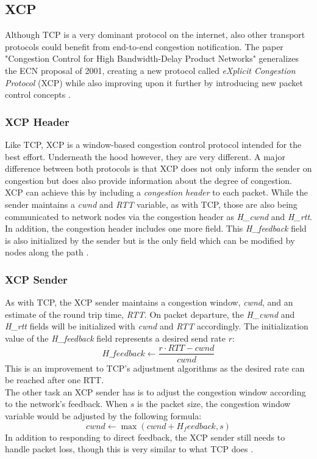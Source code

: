 \documentclass[a4paper,conference]{IEEEtran}
\begin{document}
\subsection{XCP}
Although TCP is a very dominant protocol on the internet, also other transport protocols could benefit from end-to-end congestion notification. The paper "Congestion Control for High Bandwidth-Delay Product Networks"  generalizes the ECN proposal of 2001, creating a new protocol called \textit{eXplicit Congestion Protocol} (XCP) while also improving upon it further by introducing new packet control concepts \cite{katabi2002congestion,1498331}.

\subsubsection*{XCP Header}
Like TCP, XCP is a window-based congestion control protocol intended for the best effort. Underneath the hood however, they are very different. A major difference between both protocols is that XCP does not only inform the sender on congestion but does also provide information about the degree of congestion. XCP can achieve this by including a \textit{congestion header} to each packet. While the sender maintains a \textit{cwnd} and \textit{RTT} variable, as with TCP, those are also being communicated to network nodes via the congestion header as \textit{H\_cwnd} and \textit{H\_rtt}. In addition, the congestion header includes one more field. This \textit{H\_feedback} field is also initialized by the sender but is the only field which can be modified by nodes along the path \cite{katabi2002congestion,1498331}.

\subsubsection*{XCP Sender}
As with TCP, the XCP sender maintains a congestion window, \textit{cwnd}, and an estimate of the round trip time, \textit{RTT}. On packet departure, the \textit{H\_cwnd} and \textit{H\_rtt} fields will be initialized with \textit{cwnd} and \textit{RTT} accordingly. The initialization value of the \textit{H\_feedback} field represents a desired send rate $r$:
\[H\_feedback \leftarrow \frac{r \cdot RTT - cwnd}{cwnd}\]
This is an improvement to TCP's adjustment algorithms as the desired rate can be reached after one RTT.\\
The other task an XCP sender has is to adjust the congestion window according to the network's feedback. When $s$ is the packet size, the congestion window variable would be adjusted by the following formula:
\[cwnd \leftarrow \max(cwnd + H_feedback, s)\]
In addition to responding to direct feedback, the XCP sender still needs to handle packet loss, though this is very similar to what TCP does \cite{katabi2002congestion}.
\end{document}
